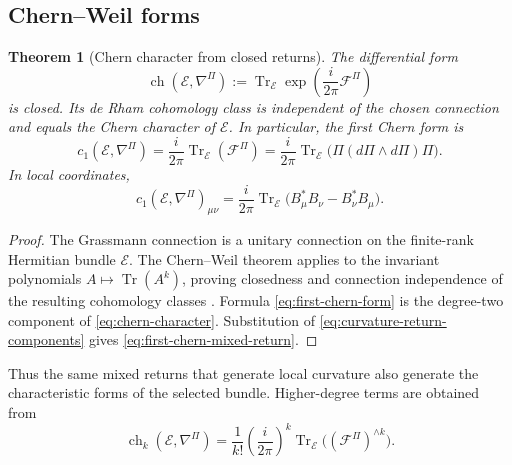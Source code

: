 \documentclass[11pt,reqno]{scrartcl}
\DeclareMathOperator{\Tr}{Tr}
\newcommand{\gaugeF}{\mathcal F}
\theoremstyle{plain}
\newtheorem{theorem}{Theorem}[section]
\theoremstyle{definition}
\theoremstyle{remark}
\begin{document}
\subsection{Chern--Weil forms}

\begin{theorem}[Chern character from closed returns]
\label{thm:chern-character}
The differential form
\begin{equation}
  \operatorname{ch}(\mathscr E,\nabla^\Pi)
  :=\Tr_{\mathscr E}
  \exp\!\left(\frac{i}{2\pi}\gaugeF^\Pi\right)
  \label{eq:chern-character}
\end{equation}
is closed.  Its de Rham cohomology class is independent of the chosen
connection and equals the Chern character of \(\mathscr E\).  In particular,
the first Chern form is
\begin{equation}
  c_1(\mathscr E,\nabla^\Pi)
  =\frac{i}{2\pi}\Tr_{\mathscr E}(\gaugeF^\Pi)
  =\frac{i}{2\pi}\Tr_{\mathscr E}
    \bigl(\Pi(d\Pi\wedge d\Pi)\Pi\bigr).
  \label{eq:first-chern-form}
\end{equation}
In local coordinates,
\begin{equation}
  c_1(\mathscr E,\nabla^\Pi)_{\mu\nu}
  =\frac{i}{2\pi}
  \Tr_{\mathscr E}
  \bigl(B_\mu^*B_\nu-B_\nu^*B_\mu\bigr).
  \label{eq:first-chern-mixed-return}
\end{equation}
\end{theorem}

\begin{proof}
The Grassmann connection is a unitary connection on the finite-rank Hermitian
bundle \(\mathscr E\).  The Chern--Weil theorem applies to the invariant
polynomials \(A\mapsto\Tr(A^k)\), proving closedness and connection
independence of the resulting cohomology classes
\cite{KobayashiNomizu,Husemoller}.  Formula
\eqref{eq:first-chern-form} is the degree-two component of
\eqref{eq:chern-character}.  Substitution of
\eqref{eq:curvature-return-components} gives
\eqref{eq:first-chern-mixed-return}.
\end{proof}

Thus the same mixed returns that generate local curvature also generate the
characteristic forms of the selected bundle.  Higher-degree terms are
obtained from
\begin{equation}
  \operatorname{ch}_k(\mathscr E,\nabla^\Pi)
  =\frac{1}{k!}
  \left(\frac{i}{2\pi}\right)^k
  \Tr_{\mathscr E}\bigl((\gaugeF^\Pi)^{\wedge k}\bigr).
  \label{eq:higher-chern-character}
\end{equation}
\end{document}
